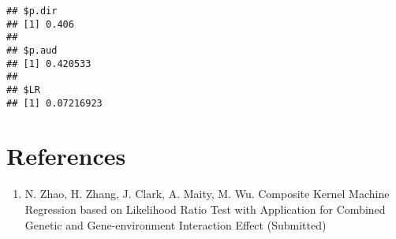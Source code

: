 \documentclass[11pt,]{article}
\providecommand{\tightlist}{%
\setlength{\itemsep}{0pt}\setlength{\parskip}{0pt}}
\begin{document}
\begin{verbatim}
## $p.dir
## [1] 0.406
## 
## $p.aud
## [1] 0.420533
## 
## $LR
## [1] 0.07216923
\end{verbatim}

\section{References}\label{references}

\begin{enumerate}
\def\labelenumi{\arabic{enumi}.}
\tightlist
\item
  N. Zhao, H. Zhang, J. Clark, A. Maity, M. Wu. Composite Kernel Machine
  Regression based on Likelihood Ratio Test with Application for
  Combined Genetic and Gene-environment Interaction Effect (Submitted)
\end{enumerate}




\newpage
\singlespacing 
\end{document}
